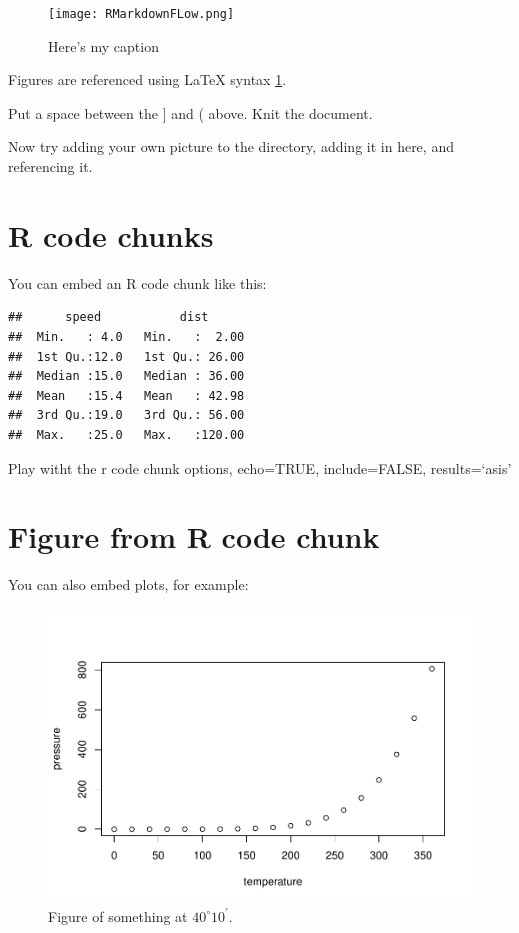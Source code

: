 \documentclass[12pt,]{article}
\begin{document}
\begin{figure}[htbp]
\centering
\texttt{[image: RMarkdownFLow.png]}
\caption{Here's my caption \label{fig:fig_example}}
\end{figure}

Figures are referenced using LaTeX syntax \ref{fig:fig_example}.

Put a space between the {]} and ( above. Knit the document.

Now try adding your own picture to the directory, adding it in here, and
referencing it.

\section{R code chunks}\label{r-code-chunks}

You can embed an R code chunk like this:

\begin{verbatim}
##      speed           dist       
##  Min.   : 4.0   Min.   :  2.00  
##  1st Qu.:12.0   1st Qu.: 26.00  
##  Median :15.0   Median : 36.00  
##  Mean   :15.4   Mean   : 42.98  
##  3rd Qu.:19.0   3rd Qu.: 56.00  
##  Max.   :25.0   Max.   :120.00
\end{verbatim}

Play witht the r code chunk options, echo=TRUE, include=FALSE,
results=`asis'

\FloatBarrier

\section{Figure from R code chunk}\label{figure-from-r-code-chunk}

You can also embed plots, for example:

\begin{figure}[htbp]
\centering
\includegraphics{4-Workshop_examples_files/figure-latex/pressure-1.pdf}
\caption{Figure of something at \(40^\circ 10^\prime\).
\label{fig:pressure}}
\end{figure}
\end{document}

